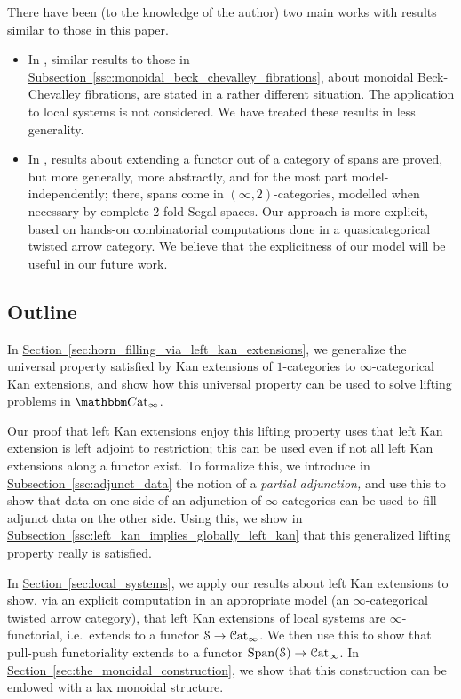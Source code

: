 \documentclass[main.tex]{subfiles}
\begin{document}
There have been (to the knowledge of the author) two main works with results similar to those in this paper.
\begin{itemize}
  \item In \cite{spectralmackeyfunctors2}, similar results to those in \hyperref[ssc:monoidal_beck_chevalley_fibrations]{Subsection~\ref*{ssc:monoidal_beck_chevalley_fibrations}}, about monoidal Beck-Chevalley fibrations, are stated in a rather different situation. The application to local systems is not considered. We have treated these results in less generality.

  \item In \cite{gaitsgory2019study}, results about extending a functor out of a category of spans are proved, but more generally, more abstractly, and for the most part model-independently; there, spans come in $(\infty, 2)$-categories, modelled when necessary by complete 2-fold Segal spaces. Our approach is more explicit, based on hands-on combinatorial computations done in a quasicategorical twisted arrow category. We believe that the explicitness of our model will be useful in our future work.
\end{itemize}

\subsection{Outline}
\label{ssc:outline}

In \hyperref[sec:horn_filling_via_left_kan_extensions]{Section~\ref*{sec:horn_filling_via_left_kan_extensions}}, we generalize the universal property satisfied by Kan extensions of $1$-categories to $\infty$-categorical Kan extensions, and show how this universal property can be used to solve lifting problems in $\ICCat$.

Our proof that left Kan extensions enjoy this lifting property uses that left Kan extension is left adjoint to restriction; this can be used even if not all left Kan extensions along a functor exist. To formalize this, we introduce in \hyperref[ssc:adjunct_data]{Subsection~\ref*{ssc:adjunct_data}} the notion of a \emph{partial adjunction,} and use this to show that data on one side of an adjunction of $\infty$-categories can be used to fill adjunct data on the other side. Using this, we show in \hyperref[ssc:left_kan_implies_globally_left_kan]{Subsection~\ref*{ssc:left_kan_implies_globally_left_kan}} that this generalized lifting property really is satisfied.

In \hyperref[sec:local_systems]{Section~\ref*{sec:local_systems}}, we apply our results about left Kan extensions to show, via an explicit computation in an appropriate model (an $\infty$-categorical twisted arrow category), that left Kan extensions of local systems are $\infty$-functorial, i.e.\ extends to a functor $\mathcal{S} \to \mathcal{C}\mathrm{at}_{\infty}$. We then use this to show that pull-push functoriality extends to a functor $\mathrm{Span}(\mathcal{S}) \to \mathcal{C}\mathrm{at}_{\infty}$. In \hyperref[sec:the_monoidal_construction]{Section~\ref*{sec:the_monoidal_construction}}, we show that this construction can be endowed with a lax monoidal structure.
\end{document}
